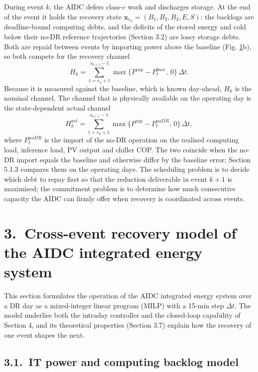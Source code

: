 \documentclass[a4paper,twocolumn,fleqn,10pt]{article}
\begin{document}
During event \(k\), the AIDC defers class-\(c\) work and discharges storage. At the end of the event it holds the recovery state \(\mathbf x_{e_k}=(B_{1},B_{2},B_{3},E,S)\): the backlogs are deadline-bound computing debts, and the deficits of the stored energy and cold below their no-DR reference trajectories (Section 3.2) are lossy storage debts. Both are repaid between events by importing power above the baseline (Fig. \hyperref[fig1]{1}b), so both compete for the recovery channel \[H_k=\sum_{t=e_k+1}^{s_{k+1}-1}\max\{P^{cap}-P^{base}_t,\,0\}\,\Delta t. \tag{1}\] Because it is measured against the baseline, which is known day-ahead, \(H_k\) is the nominal channel. The channel that is physically available on the operating day is the state-dependent actual channel \[H^{act}_k=\sum_{t=e_k+1}^{s_{k+1}-1}\max\{P^{cap}-P^{noDR}_t,\,0\}\,\Delta t, \tag{2}\] where \(P^{noDR}_t\) is the import of the no-DR operation on the realised computing load, inference load, PV output and chiller COP. The two coincide when the no-DR import equals the baseline and otherwise differ by the baseline error; Section 5.1.3 compares them on the operating days. The scheduling problem is to decide which debt to repay first so that the reduction deliverable in event \(k+1\) is maximised; the commitment problem is to determine how much consecutive capacity the AIDC can firmly offer when recovery is coordinated across events.

\section*{3.~Cross-event recovery model of the AIDC integrated energy system}

This section formulates the operation of the AIDC integrated energy system over a DR day as a mixed-integer linear program (MILP) with a 15-min step \(\Delta t\). The model underlies both the intraday controller and the closed-loop capability of Section 4, and its theoretical properties (Section 3.7) explain how the recovery of one event shapes the next.

\subsection*{3.1.~IT power and computing backlog model}
\end{document}
